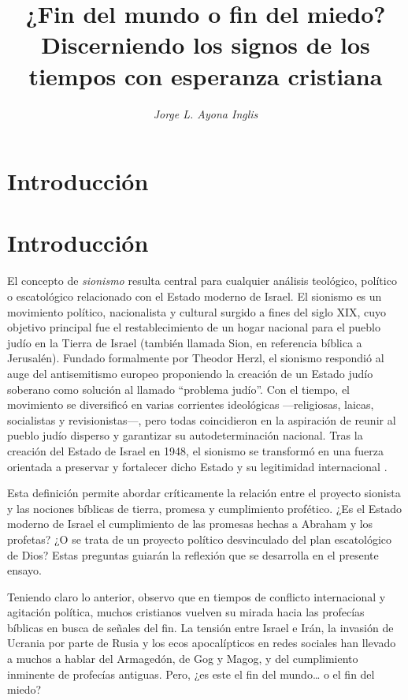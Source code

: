 \documentclass[12pt]{article}
\title{\textbf{\LARGE\centering ¿Fin del mundo o fin del miedo?\\[0.5em] \large Discerniendo los signos de los tiempos con esperanza cristiana}}
\author{\textit{Jorge L. Ayona Inglis}}
\date{}
\begin{document}
\maketitle

\section*{Introducción}

\section*{Introducción}

El concepto de \textit{sionismo} resulta central para cualquier análisis teológico, político o escatológico relacionado con el Estado moderno de Israel. El sionismo es un movimiento político, nacionalista y cultural surgido a fines del siglo XIX, cuyo objetivo principal fue el restablecimiento de un hogar nacional para el pueblo judío en la Tierra de Israel (también llamada Sion, en referencia bíblica a Jerusalén). Fundado formalmente por Theodor Herzl, el sionismo respondió al auge del antisemitismo europeo proponiendo la creación de un Estado judío soberano como solución al llamado “problema judío”. Con el tiempo, el movimiento se diversificó en varias corrientes ideológicas —religiosas, laicas, socialistas y revisionistas—, pero todas coincidieron en la aspiración de reunir al pueblo judío disperso y garantizar su autodeterminación nacional. Tras la creación del Estado de Israel en 1948, el sionismo se transformó en una fuerza orientada a preservar y fortalecer dicho Estado y su legitimidad internacional \cite{laqueur}.

Esta definición permite abordar críticamente la relación entre el proyecto sionista y las nociones bíblicas de tierra, promesa y cumplimiento profético. ¿Es el Estado moderno de Israel el cumplimiento de las promesas hechas a Abraham y los profetas? ¿O se trata de un proyecto político desvinculado del plan escatológico de Dios? Estas preguntas guiarán la reflexión que se desarrolla en el presente ensayo.

Teniendo claro lo anterior, observo que en tiempos de conflicto internacional y agitación política, muchos cristianos vuelven su mirada hacia las profecías bíblicas en busca de señales del fin. La tensión entre Israel e Irán, la invasión de Ucrania por parte de Rusia y los ecos apocalípticos en redes sociales han llevado a muchos a hablar del Armagedón, de Gog y Magog, y del cumplimiento inminente de profecías antiguas. Pero, ¿es este el fin del mundo… o el fin del miedo?
\end{document}
